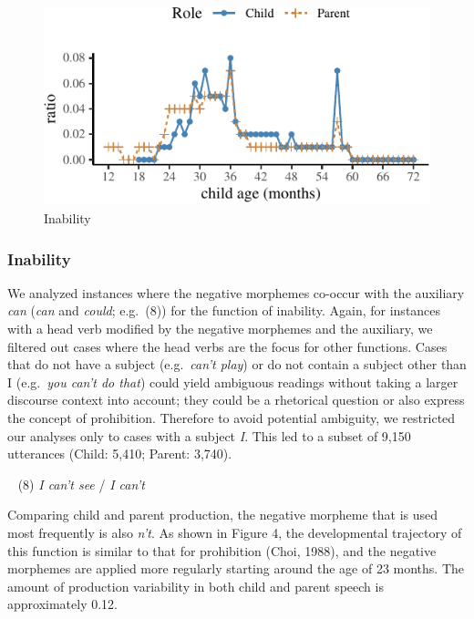 \documentclass[10pt, letterpaper]{article}
\newenvironment{CodeChunk}{}{}
\begin{document}
\begin{CodeChunk}
\begin{figure}[H]

{\centering \includegraphics{figs/inability-1} 

}

\caption[Inability]{Inability}\label{fig:inability}
\end{figure}
\end{CodeChunk}

\hypertarget{inability}{%
\subsubsection{Inability}\label{inability}}

We analyzed instances where the negative morphemes co-occur with the
auxiliary \emph{can} (\emph{can} and \emph{could}; e.g.~(8)) for the
function of inability. Again, for instances with a head verb modified by
the negative morphemes and the auxiliary, we filtered out cases where
the head verbs are the focus for other functions. Cases that do not have
a subject (e.g.~\emph{can't play}) or do not contain a subject other
than I (e.g.~\emph{you can't do that}) could yield ambiguous readings
without taking a larger discourse context into account; they could be a
rhetorical question or also express the concept of prohibition.
Therefore to avoid potential ambiguity, we restricted our analyses only
to cases with a subject \emph{I}. This led to a subset of 9,150
utterances (Child: 5,410; Parent: 3,740).

~ (8) \emph{I can't see} / \emph{I can't}

Comparing child and parent production, the negative morpheme that is
used most frequently is also \emph{n't}. As shown in Figure 4, the
developmental trajectory of this function is similar to that for
prohibition (Choi, 1988), and the negative morphemes are applied more
regularly starting around the age of 23 months. The amount of production
variability in both child and parent speech is approximately 0.12.
\end{document}
